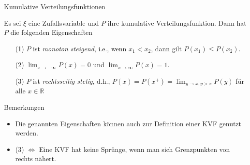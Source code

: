 \documentclass[
  8pt,
  ignorenonframetext,
]{beamer}
\begin{document}
\begin{frame}{Kumulative Verteilungsfunktionen}
\protect\hypertarget{kumulative-verteilungsfunktionen-3}{}
\small
\begin{theorem}
\normalfont
Es sei $\xi$ eine Zufallsvariable und $P$ ihre kumulative Verteilungsfunktion.
Dann hat $P$ die folgenden Eigenschaften
\begin{itemize}
\item[(1)] $P$ ist \textit{monoton steigend}, i.e., wenn $x_1 < x_2$, dann gilt $P(x_1)\le P(x_2)$.
\item[(2)] $\lim_{x \to -\infty}P(x) = 0$ und $\lim_{x \to \infty}P(x) = 1$.
\item[(3)] $P$ ist \textit{rechtsseitig stetig}, d.h., $P(x) = P(x^+) = \lim_{y \to x, y > x} P(y)$ für alle $x \in \mathbb{R}$
\end{itemize}
\end{theorem}

Bemerkungen

\begin{itemize}
\item Die genannten Eigenschaften können auch zur Definition einer KVF genutzt werden.
\item (3) $\Leftrightarrow$
Eine KVF hat keine Sprünge, wenn man sich Grenzpunkten von rechts nähert.
\end{itemize}
\end{frame}
\end{document}
